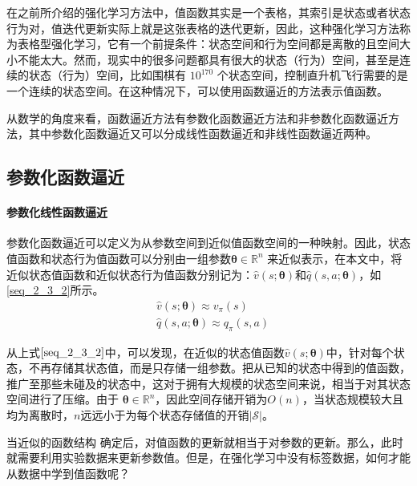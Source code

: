 在之前所介绍的强化学习方法中，值函数其实是一个表格，其索引是状态或者状态行为对，值迭代更新实际上就是这张表格的迭代更新，因此，这种强化学习方法称为表格型强化学习，它有一个前提条件：状态空间和行为空间都是离散的且空间大小不能太大。然而，现实中的很多问题都具有很大的状态（行为）空间，甚至是连续的状态（行为）空间，比如围棋有 $10^{170}$  个状态空间，控制直升机飞行需要的是一个连续的状态空间。在这种情况下，可以使用函数逼近的方法表示值函数。

从数学的角度来看，函数逼近方法有参数化函数逼近方法和非参数化函数逼近方法，其中参数化函数逼近又可以分成线性函数逼近和非线性函数逼近两种\citep{强化学习中值函数逼近方法的研究}。

\subsection{参数化函数逼近}

\paragraph{参数化线性函数逼近}
参数化函数逼近可以定义为从参数空间到近似值函数空间的一种映射\citep{强化学习中值函数逼近方法的研究}。因此，状态值函数和状态行为值函数可以分别由一组参数$\bm{\theta}\in \mathbb{R}^{n} $ 来近似表示，在本文中，将近似状态值函数和近似状态行为值函数分别记为：$\hat{v}(s;\bm{\theta})$和$\hat{q}(s,a;\bm{\theta})$，如\eqref{seq_2_3_2}所示。
\begin{equation}
\label{seq_2_3_2}
\begin{aligned}
&\hat{v}(s;\bm{\theta})\approx v_{\pi}(s)\\
&\hat{q}(s,a;\bm{\theta})\approx q_{\pi}(s,a)
\end{aligned}
\end{equation}

从上式$\eqref{seq_2_3_2}$中，可以发现，在近似的状态值函数$\hat{v}(s;\bm{\theta})$中，针对每个状态，不再存储其状态值，而是只存储一组参数。把从已知的状态中得到的值函数，推广至那些未碰及的状态中，这对于拥有大规模的状态空间来说，相当于对其状态空间进行了压缩。由于 $\bm{\theta}\in \mathbb{R}^{n}$，因此空间存储开销为$O(n)$，当状态规模较大且均为离散时，$n$远远小于为每个状态存储值的开销$|\mathcal{S}|$。

当近似的函数结构
确定后，对值函数的更新就相当于对参数的更新。那么，此时就需要利用实验数据来更新参数值。但是，在强化学习中没有标签数据，如何才能从数据中学到值函数呢？

